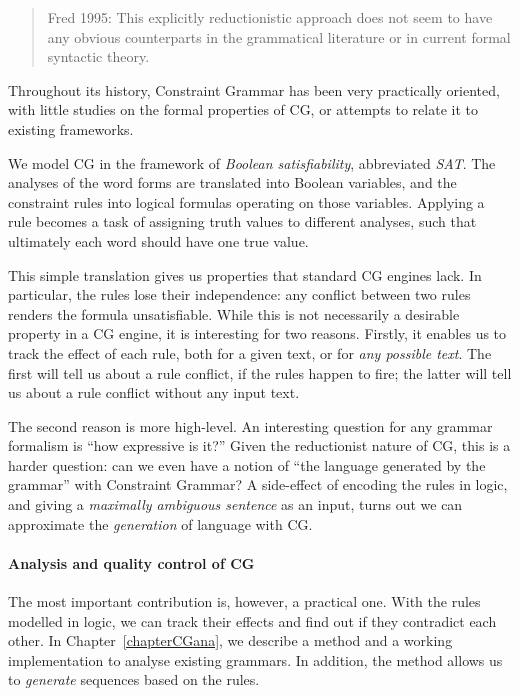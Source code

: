 \begin{quote}Fred 1995: This explicitly reductionistic approach does not seem to have any obvious counterparts in the grammatical literature or in current formal syntactic theory.\end{quote}

Throughout its history, Constraint Grammar has been very practically oriented, with 
little studies on the formal properties of CG, or attempts to relate it to existing
frameworks.

We model CG in the framework of \emph{Boolean satisfiability}, abbreviated \emph{SAT}.
The analyses of the word forms are translated into Boolean variables, 
and the constraint rules into logical formulas operating on those variables.
Applying a rule becomes a task of assigning truth values to different analyses,
such that ultimately each word should have one true value.

This simple translation gives us properties that standard CG engines lack.
In particular, the rules lose their independence: any conflict between two rules renders the formula unsatisfiable.
While this is not necessarily a desirable property in a CG engine, it is interesting for two reasons. Firstly, it enables us to track the effect of each rule, both for a given text, or for \emph{any possible text}. The first will tell us about a rule conflict, if the rules happen to fire; the latter will tell us about a rule conflict without any input text.

The second reason is more high-level.
An interesting question for any grammar formalism is ``how expressive is it?'' 
Given the reductionist nature of CG, this is a harder question:
can we even have a notion of ``the language generated by the grammar'' with Constraint Grammar?
A side-effect of encoding the rules in logic, and giving a \emph{maximally ambiguous sentence} as an input, turns out we can approximate the \emph{generation} of language with CG.

\paragraph{Analysis and quality control of CG}


The most important contribution is, however, a practical one. 
With the rules modelled in logic, we can track their effects and 
find out if they contradict each other.
In Chapter~\ref{chapterCGana}, we describe a method and a working 
implementation to analyse existing grammars. In addition, the method allows
us to \emph{generate} sequences based on the rules.


